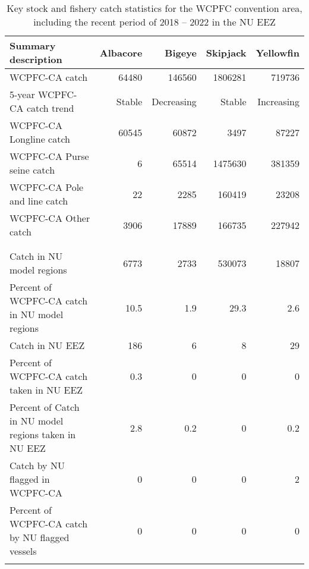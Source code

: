 \begin{longtable}{lrrrr}
\caption{Key stock and fishery catch statistics for the WCPFC convention area, including the recent period of 2018 -- 2022 in the NU EEZ} \\ 
  \hline
Summary description & Albacore & Bigeye & Skipjack & Yellowfin \\ 
  \hline
WCPFC-CA catch & 64480 & 146560 & 1806281 & 719736 \\ 
  5-year WCPFC-CA catch trend & Stable & Decreasing & Stable & Increasing \\ 
  WCPFC-CA Longline catch & 60545 & 60872 & 3497 & 87227 \\ 
  WCPFC-CA Purse seine catch & 6 & 65514 & 1475630 & 381359 \\ 
  WCPFC-CA Pole and line catch & 22 & 2285 & 160419 & 23208 \\ 
  WCPFC-CA Other catch & 3906 & 17889 & 166735 & 227942 \\ 
   &  &  &  &  \\ 
   &  &  &  &  \\ 
   \hline
Catch in NU model regions & 6773 & 2733 & 530073 & 18807 \\ 
  Percent of WCPFC-CA catch in NU model regions & 10.5 & 1.9 & 29.3 & 2.6 \\ 
  Catch in NU EEZ & 186 & 6 & 8 & 29 \\ 
  Percent of WCPFC-CA catch taken in NU EEZ & 0.3 & 0 & 0 & 0 \\ 
  Percent of Catch in NU model regions taken in NU EEZ & 2.8 & 0.2 & 0 & 0.2 \\ 
  Catch by NU flagged in WCPFC-CA & 0 & 0 & 0 & 2 \\ 
  Percent of WCPFC-CA catch by NU flagged vessels & 0 & 0 & 0 & 0 \\ 
  \hline
\label{cat_sum_tab}
\end{longtable}
